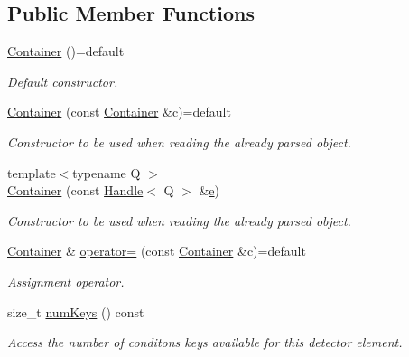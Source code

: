 \subsection*{Public Member Functions}
\begin{DoxyCompactItemize}
\item 
\hyperlink{class_d_d4hep_1_1_conditions_1_1_container_a818694fd4f2a174649be6e820e57c6ab}{Container} ()=default
\begin{DoxyCompactList}\small\item\em Default constructor. \end{DoxyCompactList}\item 
\hyperlink{class_d_d4hep_1_1_conditions_1_1_container_aafd4287ec4d43cc16b8ac5591ec4e75e}{Container} (const \hyperlink{class_d_d4hep_1_1_conditions_1_1_container}{Container} \&c)=default
\begin{DoxyCompactList}\small\item\em Constructor to be used when reading the already parsed object. \end{DoxyCompactList}\item 
{\footnotesize template$<$typename Q $>$ }\\\hyperlink{class_d_d4hep_1_1_conditions_1_1_container_a830ecf1eb136747f5e0698533b73685c}{Container} (const \hyperlink{class_d_d4hep_1_1_handle}{Handle}$<$ Q $>$ \&\hyperlink{_volumes_8cpp_a8a9a1f93e9b09afccaec215310e64142}{e})
\begin{DoxyCompactList}\small\item\em Constructor to be used when reading the already parsed object. \end{DoxyCompactList}\item 
\hyperlink{class_d_d4hep_1_1_conditions_1_1_container}{Container} \& \hyperlink{class_d_d4hep_1_1_conditions_1_1_container_a8552c753d6e74cac2a89229026e85c3c}{operator=} (const \hyperlink{class_d_d4hep_1_1_conditions_1_1_container}{Container} \&c)=default
\begin{DoxyCompactList}\small\item\em Assignment operator. \end{DoxyCompactList}\item 
size\+\_\+t \hyperlink{class_d_d4hep_1_1_conditions_1_1_container_a95b375e1bc0e962b8e226467f6b39221}{num\+Keys} () const
\begin{DoxyCompactList}\small\item\em Access the number of conditons keys available for this detector element. \end{DoxyCompactList}\item 

\end{DoxyCompactItemize}
